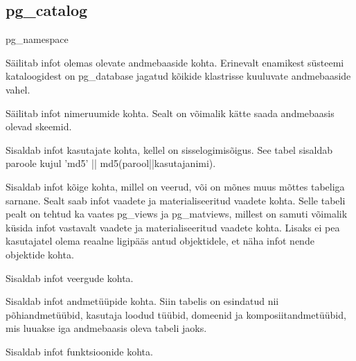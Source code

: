 \documentclass[a4paper,12pt]{article} %
\begin{document}
\subsection*{pg\_catalog}
\begin{labeling}{pg\_namespace}
\item [pg\_database] Säilitab infot olemas olevate andmebaaside kohta. Erinevalt enamikest süsteemi kataloogidest on pg\_database jagatud kõikide klastrisse kuuluvate andmebaaside vahel.
\item [pg\_namespace] Säilitab infot nimeruumide kohta. Sealt on võimalik kätte saada andmebaasis olevad skeemid.
\item [pg\_shadow] Sisaldab infot kasutajate kohta, kellel on sisselogimisõigus. See tabel sisaldab paroole kujul 'md5' || md5(parool||kasutajanimi).
\item [pg\_class] Sisaldab infot kõige kohta, millel on veerud, või on mõnes muus mõttes tabeliga sarnane. Sealt saab infot vaadete ja materialiseeritud vaadete kohta. Selle tabeli pealt on tehtud ka vaates pg\_views ja pg\_matviews, millest on samuti võimalik küsida infot vastavalt vaadete ja materialiseeritud vaadete kohta. Lisaks ei pea kasutajatel olema reaalne ligipääs antud objektidele, et näha infot nende objektide kohta.
\item [pg\_attribute] Sisaldab infot veergude kohta.
\item [pg\_type] Sisaldab infot andmetüüpide kohta. Siin tabelis on esindatud nii põhiandmetüübid, kasutaja loodud tüübid, domeenid ja komposiitandmetüübid, mis luuakse iga andmebaasis oleva tabeli jaoks.
\item [pg\_proc] Sisaldab infot funktsioonide kohta.
\end{labeling}
\cite{PostgreSQLSystemCatalogs}
\end{document}
